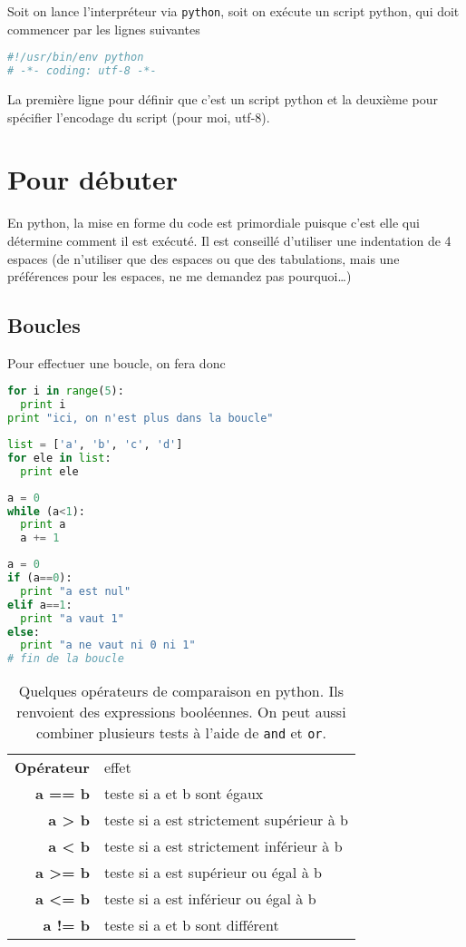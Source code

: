 \documentclass[a4paper,twoside]{article}
\title{}
\author{Autiwa}
\begin{document}
\tableofcontents

\clearpage
Soit on lance l'interpréteur via \verb|python|, soit on exécute un script python, qui doit commencer par les lignes suivantes
\begin{lstlisting}[language=python]
#!/usr/bin/env python
# -*- coding: utf-8 -*-
\end{lstlisting}

La première ligne pour définir que c'est un script python et la deuxième pour spécifier l'encodage du script (pour moi, utf-8).

\section{Pour débuter}
En python, la mise en forme du code est primordiale puisque c'est elle qui détermine comment il est exécuté. Il est conseillé d'utiliser une indentation de 4 espaces (de n'utiliser que des espaces ou que des tabulations, mais une préférences pour les espaces, ne me demandez pas pourquoi\dots)

\subsection{Boucles}
Pour effectuer une boucle, on fera donc
\begin{lstlisting}[language=python]
for i in range(5):
  print i
print "ici, on n'est plus dans la boucle"
\end{lstlisting}

\begin{lstlisting}[language=python]
list = ['a', 'b', 'c', 'd']
for ele in list:
  print ele
\end{lstlisting}

\begin{lstlisting}[language=python]
a = 0
while (a<1):
  print a
  a += 1
\end{lstlisting}

\begin{lstlisting}[language=python]
a = 0
if (a==0):
  print "a est nul"
elif a==1:
  print "a vaut 1"
else:
  print "a ne vaut ni 0 ni 1"
# fin de la boucle
\end{lstlisting}

\begin{table}[htb]
\begin{tabular}{>{\bfseries}r<{}@{ : }p{11cm}}
Opérateur &	effet\\
a == b & teste si a et b sont égaux\\
a > b & teste si a est strictement supérieur à b\\
a < b & teste si a est strictement inférieur à b\\
a >= b & teste si a est supérieur ou égal à b\\
a <= b & teste si a est inférieur ou égal à b\\
a != b & teste si a et b sont différent
\end{tabular}
\caption{Quelques opérateurs de comparaison en python. Ils renvoient des expressions booléennes. On peut aussi combiner plusieurs tests à l'aide de \texttt{and} et \texttt{or}.}
\end{table}
\end{document}
